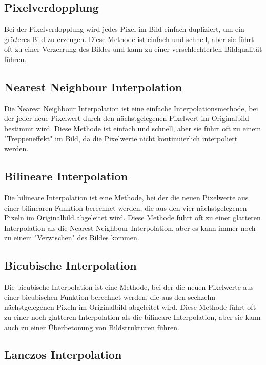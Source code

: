 \subsection{Pixelverdopplung}

Bei der Pixelverdopplung wird jedes Pixel im Bild einfach dupliziert, um ein größeres Bild zu erzeugen. 
Diese Methode ist einfach und schnell, aber sie führt oft zu einer Verzerrung des Bildes und kann zu einer verschlechterten Bildqualität führen.

\subsection{Nearest Neighbour Interpolation}

Die Nearest Neighbour Interpolation ist eine einfache Interpolationsmethode, bei der jeder neue Pixelwert durch den nächstgelegenen Pixelwert im Originalbild bestimmt wird. 
Diese Methode ist einfach und schnell, aber sie führt oft zu einem "Treppeneffekt" im Bild, da die Pixelwerte nicht kontinuierlich interpoliert werden.

\subsection{Bilineare Interpolation}

Die bilineare Interpolation ist eine Methode, bei der die neuen Pixelwerte aus einer bilinearen Funktion berechnet werden, die aus den vier nächstgelegenen Pixeln im Originalbild abgeleitet wird. 
Diese Methode führt oft zu einer glatteren Interpolation als die Nearest Neighbour Interpolation, aber es kann immer noch zu einem "Verwischen" des Bildes kommen.

\subsection{Bicubische Interpolation}

Die bicubische Interpolation ist eine Methode, bei der die neuen Pixelwerte aus einer bicubischen Funktion berechnet werden, die aus den sechzehn nächstgelegenen Pixeln im Originalbild abgeleitet wird.
Diese Methode führt oft zu einer noch glatteren Interpolation als die bilineare Interpolation, aber sie kann auch zu einer Überbetonung von Bildstrukturen führen.

\subsection{Lanczos Interpolation}

